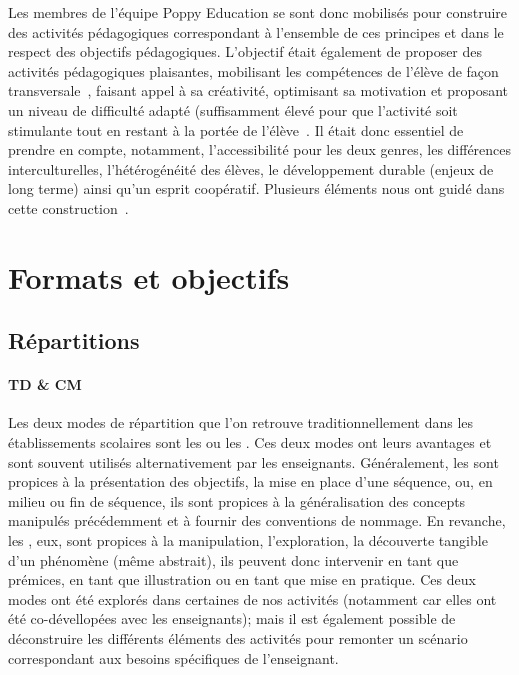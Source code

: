     Les membres de l’équipe Poppy Education se sont donc mobilisés pour construire des activités pédagogiques correspondant à l’ensemble de ces principes et dans le respect des objectifs pédagogiques. %
    L’objectif était également de proposer des activités pédagogiques plaisantes, mobilisant les compétences de l’élève de façon transversale~, faisant appel à sa créativité, optimisant sa motivation et proposant un niveau de difficulté adapté (suffisamment élevé pour que l’activité soit stimulante tout en restant à la portée de l’élève~. Il était donc essentiel de prendre en compte, notamment, l’accessibilité pour les deux genres, les différences interculturelles, l’hétérogénéité des élèves, le développement durable (enjeux de long terme) ainsi qu’un esprit coopératif. Plusieurs éléments nous ont guidé dans cette construction~.
\section{Formats et objectifs}
    \subsection{Répartitions}
        \paragraph{TD \& CM} 
            Les deux modes de répartition que l'on retrouve traditionnellement dans les établissements scolaires sont les  ou les . Ces deux modes ont leurs avantages et sont souvent utilisés alternativement par les enseignants. Généralement, les  sont propices à la présentation des objectifs, la mise en place d'une séquence, ou, en milieu ou fin de séquence, ils sont propices à la généralisation des concepts manipulés précédemment et à fournir des conventions de nommage. En revanche, les , eux, sont propices à la manipulation, l'exploration, la découverte tangible d'un phénomène (même abstrait), ils peuvent donc intervenir en tant que prémices, en tant que illustration ou en tant que mise en pratique. Ces deux modes ont été explorés dans certaines de nos activités   (notamment car elles ont été co-dévellopées avec les enseignants); mais il est également possible de déconstruire les différents éléments des activités pour remonter un scénario correspondant aux besoins spécifiques de l'enseignant.
